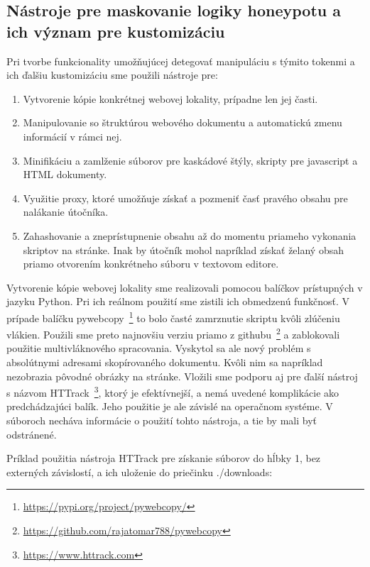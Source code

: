 \documentclass[conference, 11pt,slovak,a4paper,twoside]{IEEEtran}
\begin{document}
\subsection{Nástroje pre maskovanie logiky honeypotu a ich význam pre kustomizáciu} \label{toolsForConcealingCustomization}

Pri tvorbe funkcionality umožňujúcej detegovať manipuláciu s týmito tokenmi a ich ďalšiu kustomizáciu sme použili nástroje pre:

\begin{enumerate}
	\item Vytvorenie kópie konkrétnej webovej lokality, prípadne len jej časti. 

	\item Manipulovanie so štruktúrou webového dokumentu a automatickú zmenu informácií v rámci nej.
	
	\item Minifikáciu a zamlženie súborov pre kaskádové štýly, skripty pre javascript a HTML dokumenty. 

	\item Využitie proxy, ktoré umožňuje získať a pozmeniť časť pravého obsahu pre nalákanie útočníka.
	
	\item Zahashovanie a zneprístupnenie obsahu až do momentu priameho vykonania skriptov na stránke. Inak by útočník mohol napríklad získať želaný obsah priamo otvorením konkrétneho súboru v textovom editore.
\end{enumerate}

Vytvorenie kópie webovej lokality sme realizovali pomocou balíčkov prístupných v jazyku Python. Pri ich reálnom použití sme zistili ich obmedzenú funkčnosť. V prípade balíčku pywebcopy~\footnote{\url{https://pypi.org/project/pywebcopy/}} to bolo časté zamrznutie skriptu kvôli zlúčeniu vlákien. Použili sme preto najnovšiu verziu priamo z githubu~\footnote{\url{https://github.com/rajatomar788/pywebcopy}} a zablokovali použitie multivláknového spracovania. Vyskytol sa ale nový problém s absolútnymi adresami skopírovaného dokumentu. Kvôli nim sa napríklad nezobrazia pôvodné obrázky na stránke. Vložili sme podporu aj pre ďalší nástroj s názvom HTTrack~\footnote{\url{https://www.httrack.com}}, ktorý je efektívnejší, a nemá uvedené komplikácie ako predchádzajúci balík. Jeho použitie je ale závislé na operačnom systéme. V súboroch necháva informácie o použití tohto nástroja, a tie by mali byť odstránené.

Príklad použitia nástroja HTTrack pre získanie súborov do hĺbky 1, bez externých závislostí, a ich uloženie do priečinku ./downloads:
\end{document}

